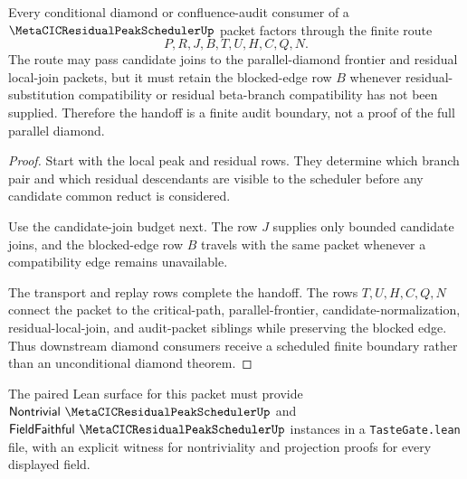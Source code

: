 \begin{theorem}
\label{thm:metacic-residual-peak-scheduler-diamond-handoff}
Every conditional diamond or confluence-audit consumer of a $\MetaCICResidualPeakSchedulerUp$ packet factors through the finite route
$$
P,R,J,B,T,U,H,C,Q,N .
$$
The route may pass candidate joins to the parallel-diamond frontier and residual local-join packets, but it must retain the blocked-edge row $B$ whenever residual-substitution compatibility or residual beta-branch compatibility has not been supplied. Therefore the handoff is a finite audit boundary, not a proof of the full parallel diamond.
\end{theorem}
\begin{proof}
Start with the local peak and residual rows. They determine which branch pair and which residual descendants are visible to the scheduler before any candidate common reduct is considered.

Use the candidate-join budget next. The row $J$ supplies only bounded candidate joins, and the blocked-edge row $B$ travels with the same packet whenever a compatibility edge remains unavailable.

The transport and replay rows complete the handoff. The rows $T,U,H,C,Q,N$ connect the packet to the critical-path, parallel-frontier, candidate-normalization, residual-local-join, and audit-packet siblings while preserving the blocked edge. Thus downstream diamond consumers receive a scheduled finite boundary rather than an unconditional diamond theorem.
\end{proof}



The paired Lean surface for this packet must provide $\mathsf{Nontrivial}\ \MetaCICResidualPeakSchedulerUp$ and $\mathsf{FieldFaithful}\ \MetaCICResidualPeakSchedulerUp$ instances in a \texttt{TasteGate.lean} file, with an explicit witness for nontriviality and projection proofs for every displayed field.

